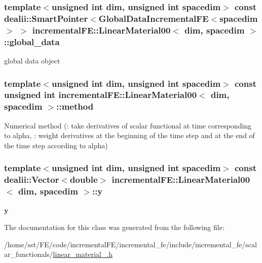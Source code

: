 \subsubsection[{\texorpdfstring{global\+\_\+data}{global_data}}]{\setlength{\rightskip}{0pt plus 5cm}template$<$unsigned int dim, unsigned int spacedim$>$ const dealii\+::\+Smart\+Pointer$<${\bf Global\+Data\+Incremental\+FE}$<$spacedim$>$ $>$ {\bf incremental\+F\+E\+::\+Linear\+Material00}$<$ dim, spacedim $>$\+::global\+\_\+data\hspace{0.3cm}{\ttfamily [private]}}\hypertarget{classincremental_f_e_1_1_linear_material00_adc2fce8d6428b316b1b5a6245fc93629}{}\label{classincremental_f_e_1_1_linear_material00_adc2fce8d6428b316b1b5a6245fc93629}
global data object 
\subsubsection[{\texorpdfstring{method}{method}}]{\setlength{\rightskip}{0pt plus 5cm}template$<$unsigned int dim, unsigned int spacedim$>$ const unsigned int {\bf incremental\+F\+E\+::\+Linear\+Material00}$<$ dim, spacedim $>$\+::method\hspace{0.3cm}{\ttfamily [private]}}\hypertarget{classincremental_f_e_1_1_linear_material00_abc882081c652f94f40a24eb47da078fa}{}\label{classincremental_f_e_1_1_linear_material00_abc882081c652f94f40a24eb47da078fa}
Numerical method ({}\+: take derivatives of scalar functional at time corresponding to {\ttfamily alpha}, {}\+: weight derivatives at the beginning of the time step and at the end of the time step according to {\ttfamily alpha}) 
\subsubsection[{\texorpdfstring{y}{y}}]{\setlength{\rightskip}{0pt plus 5cm}template$<$unsigned int dim, unsigned int spacedim$>$ const {\bf dealii\+::\+Vector}$<$double$>$ {\bf incremental\+F\+E\+::\+Linear\+Material00}$<$ dim, spacedim $>$\+::y\hspace{0.3cm}{\ttfamily [private]}}\hypertarget{classincremental_f_e_1_1_linear_material00_a4b080a85b2d860bfaadbd1480cb9a69b}{}\label{classincremental_f_e_1_1_linear_material00_a4b080a85b2d860bfaadbd1480cb9a69b}
$\boldsymbol{y}$ 

The documentation for this class was generated from the following file\+:\begin{DoxyCompactItemize}
\item 
/home/sst/\+F\+E/code/incremental\+F\+E/incremental\+\_\+fe/include/incremental\+\_\+fe/scalar\+\_\+functionals/\hyperlink{linear__material__00_8h}{linear\+\_\+material\+\_.\+h}\end{DoxyCompactItemize}

